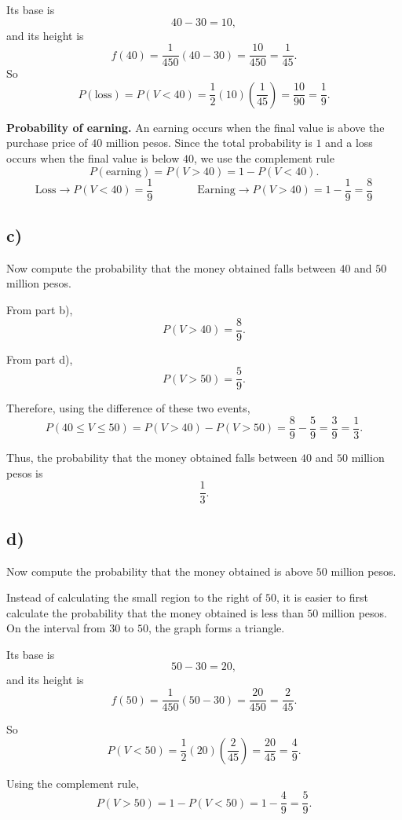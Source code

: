 Its base is
\[
40-30=10,
\]
and its height is
\[
f(40)=\frac{1}{450}(40-30)=\frac{10}{450}=\frac{1}{45}.
\]
So
\[
P(\text{loss})=P(V<40)=\frac12(10)\left(\frac{1}{45}\right)=\frac{10}{90}=\frac{1}{9}.
\]

\textbf{Probability of earning.}
An earning occurs when the final value is above the purchase price of $40$ million pesos. Since the total probability is $1$ and a loss occurs when the final value is below $40$, we use the complement rule
\[
P(\text{earning})=P(V>40)=1-P(V<40).
\]
\[
\text{Loss} \rightarrow P(V<40)=\frac{1}{9}
\qquad\qquad
\text{Earning} \rightarrow P(V>40)=1-\frac{1}{9}=\frac{8}{9}
\]


\subsection*{c)}
Now compute the probability that the money obtained falls between $40$ and $50$ million pesos.

From part b),
\[
P(V>40)=\frac{8}{9}.
\]

From part d),
\[
P(V>50)=\frac{5}{9}.
\]

Therefore, using the difference of these two events,
\[
P(40\le V\le 50)=P(V>40)-P(V>50)
=\frac{8}{9}-\frac{5}{9}
=\frac{3}{9}=\frac{1}{3}.
\]

Thus, the probability that the money obtained falls between $40$ and $50$ million pesos is
\[
\frac{1}{3}.
\]

\subsection*{d)}
Now compute the probability that the money obtained is above $50$ million pesos.

Instead of calculating the small region to the right of $50$, it is easier to first calculate the probability that the money obtained is less than $50$ million pesos. On the interval from $30$ to $50$, the graph forms a triangle.

Its base is
\[
50-30=20,
\]
and its height is
\[
f(50)=\frac{1}{450}(50-30)=\frac{20}{450}=\frac{2}{45}.
\]

So
\[
P(V<50)=\frac12(20)\left(\frac{2}{45}\right)=\frac{20}{45}=\frac{4}{9}.
\]

Using the complement rule,
\[
P(V>50)=1-P(V<50)=1-\frac{4}{9}=\frac{5}{9}.
\]

